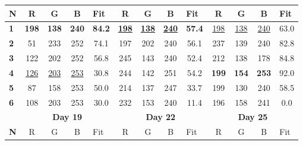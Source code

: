 \documentclass[preprint, review, 12pt]{elsarticle}
\begin{document}
\begin{table}[htbp]
{\begin{tabular}{l|cccc|cccc|cccc|}
\multicolumn{1}{|l|}{\textbf{N}} & R            & G            & B            & \multicolumn{1}{l|}{Fit}        & R            & G            & B            & \multicolumn{1}{l|}{Fit} & R            & G            & B            & \multicolumn{1}{l|}{Fit} \\ \hline
\multicolumn{1}{|l|}{\textbf{1}} & \textbf{198} & \textbf{138} & \textbf{240} & \textbf{84.2}                   & \underline{\textbf{198}}& \underline{\textbf{138}}& \underline{\textbf{240}}& \textbf{57.4}& \underline{198}& \underline{138}& \underline{240}& 63.0                     \\
\multicolumn{1}{|l|}{\textbf{2}} & 51           & 233          & 252          & 74.1                            & 197          & 202          & 240          & 56.1                     & 237          & 139          & 240          & 82.8                     \\
\multicolumn{1}{|l|}{\textbf{3}} & 122          & 202          & 252          & 56.8                            & 245          & 143          & 240          & 52.4                     & 212          & 138          & 178          & 84.8                     \\
\multicolumn{1}{|l|}{\textbf{4}} & \underline{126}& \underline{203}& \underline{253}& 30.8                            & 244          & 142          & 251          & 54.2                     & \textbf{199} & \textbf{154} & \textbf{253} & 92.0                     \\
\multicolumn{1}{|l|}{\textbf{5}} & 87           & 158          & 253          & 50.0                            & 214          & 137          & 247          & 33.7                     & 199          & 130          & 240          & 58.5                     \\
\multicolumn{1}{|l|}{\textbf{6}} & 108          & 203          & 253          & 30.0                            & 232          & 153          & 240          & 11.4                     & 196          & 158          & 241          & 0.0                      \\ \hline
                                 & \multicolumn{4}{c|}{\textbf{Day 19}}                                         & \multicolumn{4}{c|}{\textbf{Day 22}}                                  & \multicolumn{4}{c|}{\textbf{Day 25}}                                  \\ \hline
\multicolumn{1}{|l|}{\textbf{N}} & R            & G            & B            & \multicolumn{1}{l|}{Fit}        & R            & G            & B            & \multicolumn{1}{l|}{Fit} & R            & G            & B            & \multicolumn{1}{l|}{Fit} \\ \hline

\end{tabular}}
\end{table}
\end{document}
